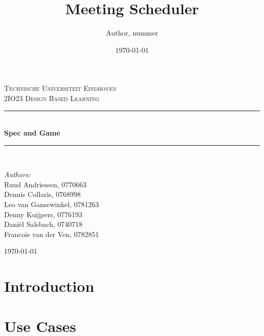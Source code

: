 \documentclass[a4paper,twoside,11pt]{article}
\title{\vspace{-\baselineskip}\sffamily\bfseries Meeting Scheduler}
\author{Author, nummer}
\date{\today}
\newcommand{\HRule}{\rule{\linewidth}{0.5mm}}
\begin{document}

\begin{titlepage}

\begin{center}

 

\textsc{\LARGE Technische Universiteit Eindhoven}\\[1.5cm]

\textsc{\Large 2IO23 Design Based Learning}\\[0.5cm]


\HRule \\[0.4cm]
{ \huge \bfseries Spec and Game}\\[0.4cm]
\HRule \\[1.5cm]

\begin{minipage}{0.4\textwidth}
\begin{flushleft} \large
\emph{Authors:}\\
Ruud Andriessen, 0770663\\
Dennis Collaris, 0768998\\
Leo van Gansewinkel, 0781263\\
Denny Kuijpers, 0776193\\
Daniël Salsbach, 0740718\\
Francois van der Ven, 0782851
\end{flushleft}
\end{minipage}
\begin{minipage}{0.4\textwidth}
\begin{flushright} \large

\end{flushright}
\end{minipage}
\vfill
{\large \today}
\end{center}
\end{titlepage}
\tableofcontents
\newpage
\section{Introduction}
\section{Use Cases}
\end{document}
